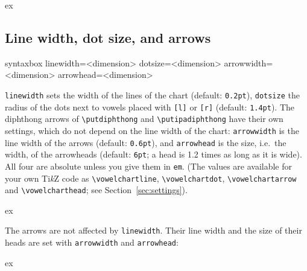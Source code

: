 \documentclass[a4paper,11pt]{article}
\newcommand\cmd[1]{\texttt{\textbackslash #1}}
\newcommand\opt[1]{\texttt{#1}}
\begin{document}
\begin{tcblisting}{ex}
\begin{vowelchart}[2cm, font=\sffamily, fontsize=16pt]
\end{vowelchart}
\end{tcblisting}




\subsection{Line width, dot size, and arrows} \label{sec:linesdots}

\begin{tcblisting}{syntaxbox}
linewidth=<dimension>        dotsize=<dimension>
arrowwidth=<dimension>       arrowhead=<dimension>
\end{tcblisting}

\noindent
\opt{linewidth} sets the width of the lines of the chart (default: \texttt{0.2pt}), \opt{dotsize} the radius of the dots next to vowels placed with \texttt{[l]} or \texttt{[r]} (default: \texttt{1.4pt}).
The diphthong arrows of \cmd{putdiphthong} and \cmd{putipadiphthong} have their own settings, which do not depend on the line width of the chart: \opt{arrowwidth} is the line width of the arrows (default: \texttt{0.6pt}), and \opt{arrowhead} is the size, i.e.\ the width, of the arrowheads (default: \texttt{6pt}; a head is 1.2 times as long as it is wide).
All four are absolute unless you give them in \texttt{em}. (The values are available for your own Ti\textit{k}Z code as \cmd{vowelchartline}, \cmd{vowelchartdot}, \cmd{vowelchartarrow} and \cmd{vowelcharthead}; see Section~\ref{sec:settings}).

\begin{tcblisting}{ex}
\begin{vowelchart}[width=3cm, linewidth=1pt, dotsize=4pt]
\end{vowelchart}
\end{tcblisting}

\noindent
The arrows are not affected by \opt{linewidth}. Their line width and the size of their heads are set with \opt{arrowwidth} and \opt{arrowhead}:

\begin{tcblisting}{ex}
\begin{vowelchart}[width=3cm, arrowwidth=1pt, arrowhead=9pt]
\end{vowelchart}
\end{tcblisting}
\end{document}
